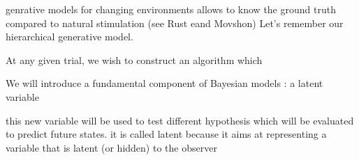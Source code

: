 \documentclass[profile,final,english, draft]{article}%
\newcommand{\citep}[1]{(\cite{#1})}
\begin{document}
%
%

genrative models for changing environments allows to know the ground truth compared to natural stimulation (see Rust eand Movshon)%
Let's remember our hierarchical generative model.

At any given trial, we wish to construct an algorithm which

We will introduce a fundamental component of Bayesian models : a latent variable

this new variable will be used to test different hypothesis which will be evaluated to predict future states. it is called latent because it aims at representing a variable that is latent (or hidden) to the observer
\end{document}
